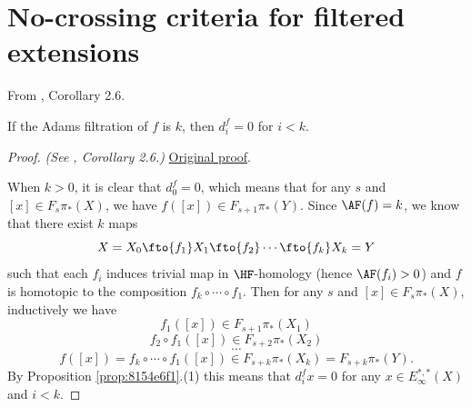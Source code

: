 \section{No-crossing criteria for filtered extensions}

\begin{corollary}
\label{paper:2.6}
From \cite{LWX126}, Corollary 2.6.\par
If the Adams filtration of $f$ is $k$, then
    $d^f_i=0$ for $i<k$.

\end{corollary}
\begin{proof}
\textit{(See \cite{LWX126}, Corollary 2.6.)} \href{paper/main.tex.html#L332}{Original proof}.

When $k>0$, it is clear that $d^f_0=0$, which means that for any $s$ and $[x]\in F_s\pi_*(X)$, we have $f([x])\in F_{s+1}\pi_*(Y)$. Since $\AF(f)=k$, we know that there exist $k$ maps
    $$X=X_0\fto{f_1}X_1\fto{f_2}\cdots\fto{f_k}X_k=Y$$
    such that each $f_i$ induces trivial map in $\HF$-homology (hence $\AF(f_i)>0$) and $f$ is homotopic to the composition $f_k\circ \cdots\circ f_1.$
    Then for any $s$ and $[x]\in F_s\pi_*(X)$, inductively we have
    $$f_1([x])\in F_{s+1}\pi_*(X_1)$$
    $$f_2\circ f_1([x])\in F_{s+2}\pi_*(X_2)$$
    $$\cdots$$
    $$f([x])=f_k\circ\cdots\circ f_1([x])\in F_{s+k}\pi_*(X_k)=F_{s+k}\pi_*(Y).$$
    By Proposition \ref{prop:8154e6f1}.(1) this means that $d_i^fx=0$ for any $x\in E_\infty^{*,*}(X)$ and $i<k$.
\end{proof}

